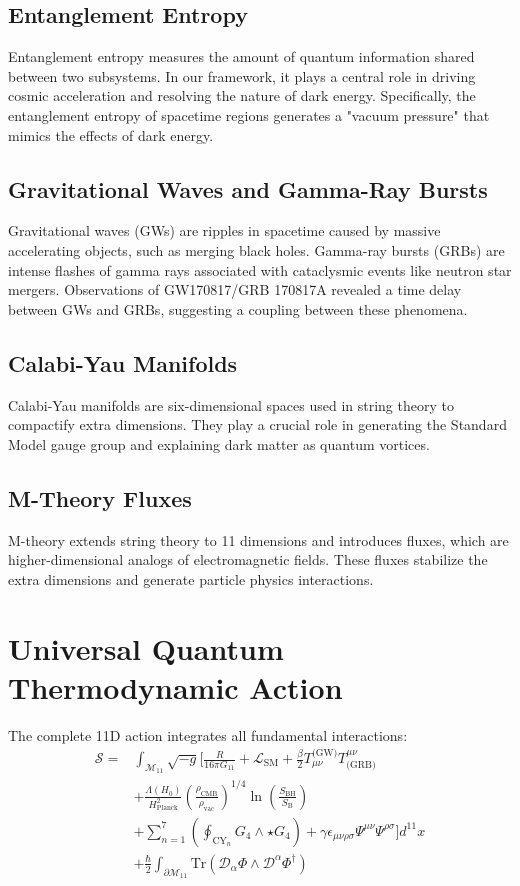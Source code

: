 \documentclass[12pt, a4paper]{article}
\begin{document}
\subsection{Entanglement Entropy}
Entanglement entropy measures the amount of quantum information shared between two subsystems. In our framework, it plays a central role in driving cosmic acceleration and resolving the nature of dark energy. Specifically, the entanglement entropy of spacetime regions generates a "vacuum pressure" that mimics the effects of dark energy.

\subsection{Gravitational Waves and Gamma-Ray Bursts}
Gravitational waves (GWs) are ripples in spacetime caused by massive accelerating objects, such as merging black holes. Gamma-ray bursts (GRBs) are intense flashes of gamma rays associated with cataclysmic events like neutron star mergers. Observations of GW170817/GRB 170817A revealed a time delay between GWs and GRBs, suggesting a coupling between these phenomena.

\subsection{Calabi-Yau Manifolds}
Calabi-Yau manifolds are six-dimensional spaces used in string theory to compactify extra dimensions. They play a crucial role in generating the Standard Model gauge group and explaining dark matter as quantum vortices.

\subsection{M-Theory Fluxes}
M-theory extends string theory to 11 dimensions and introduces fluxes, which are higher-dimensional analogs of electromagnetic fields. These fluxes stabilize the extra dimensions and generate particle physics interactions.

\section{Universal Quantum Thermodynamic Action}
The complete 11D action integrates all fundamental interactions:
\[
\boxed{
\begin{aligned}
\mathcal{S} = & \int_{\mathcal{M}_{11}} \sqrt{-g} \Bigg[ \frac{R}{16\pi G_{11}} + \mathcal{L}_{\text{SM}} + \frac{\beta}{2} T_{\mu\nu}^{\text{(GW)}} T^{\mu\nu}_{\text{(GRB)}} \\
& + \frac{\Lambda(H_0)}{H_{\text{Planck}}^2} \left( \frac{\rho_{\text{CMB}}}{\rho_{\text{vac}}} \right)^{1/4} \ln\left(\frac{S_{\text{BH}}}{S_{\text{B}}}\right) \\
& + \sum_{n=1}^7 \left( \oint_{\text{CY}_n} G_4 \wedge \star G_4 \right) + \gamma \epsilon_{\mu\nu\rho\sigma} \Psi^{\mu\nu} \Psi^{\rho\sigma} \Bigg] d^{11}x \\
& + \frac{\hbar}{2} \int_{\partial\mathcal{M}_{11}} \text{Tr}\left( \mathcal{D}_\alpha \Phi \wedge \mathcal{D}^\alpha \Phi^\dagger \right)
\end{aligned}
}
\]
\end{document}
